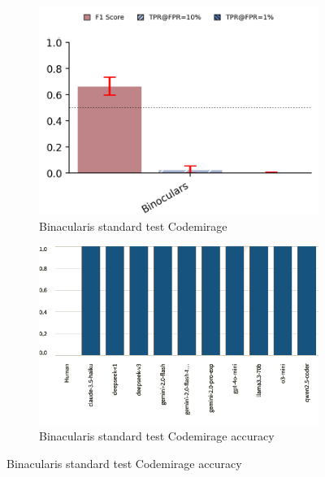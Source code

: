\begin{figure}[H]
    \centering
    \begin{subfigure}[t]{0.45\textwidth}
        \centering
        \includegraphics[width=\linewidth]{img/TEST/Binacularis_standard/UncoveringTest.png}
        \caption{Binacularis standard test Codemirage}
        \label{fig:b2gg}
    \end{subfigure}
    \hfill
    \begin{subfigure}[t]{0.45\textwidth}
        \centering
        \includegraphics[width=\linewidth]{img/TEST/Binacularis_standard/visualization(44).png}
        \caption{Binacularis standard test Codemirage accuracy}
        \label{fig:ab2gg}
    \end{subfigure}
\end{figure}


